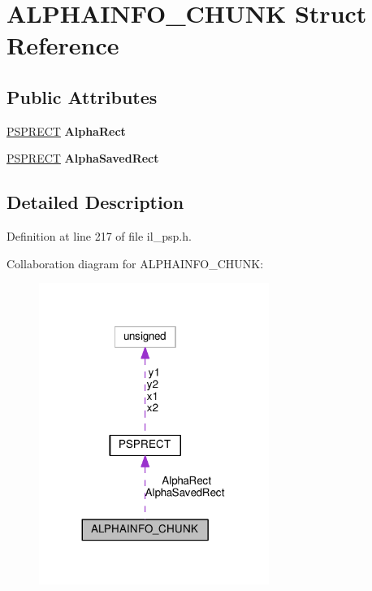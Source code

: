 \hypertarget{structALPHAINFO__CHUNK}{}\section{A\+L\+P\+H\+A\+I\+N\+F\+O\+\_\+\+C\+H\+U\+NK Struct Reference}
\label{structALPHAINFO__CHUNK}
\subsection*{Public Attributes}
\begin{DoxyCompactItemize}
\item 
\mbox{\label{structALPHAINFO__CHUNK_a41990cad701947480d6af905ef5a0935}} 
\hyperlink{structPSPRECT}{P\+S\+P\+R\+E\+CT} {\bfseries Alpha\+Rect}
\item 
\mbox{\label{structALPHAINFO__CHUNK_a4888fe60356b4797503a2cfb791988b4}} 
\hyperlink{structPSPRECT}{P\+S\+P\+R\+E\+CT} {\bfseries Alpha\+Saved\+Rect}
\end{DoxyCompactItemize}


\subsection{Detailed Description}


Definition at line 217 of file il\+\_\+psp.\+h.



Collaboration diagram for A\+L\+P\+H\+A\+I\+N\+F\+O\+\_\+\+C\+H\+U\+NK\+:
\nopagebreak
\begin{figure}[H]
\begin{center}
\leavevmode
\includegraphics[width=212pt]{d3/d68/structALPHAINFO__CHUNK__coll__graph}
\end{center}
\end{figure}


